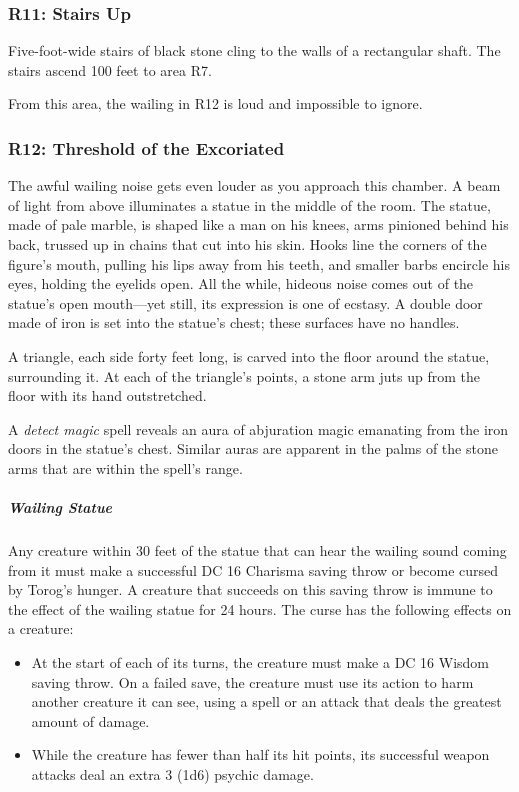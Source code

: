 \documentclass[10pt,a4paper,twoside,bg=print,twocolumn,openany,nodeprecatedcode]{dndbook}
\begin{document}
\subsubsection{R11: Stairs Up}
Five-foot-wide stairs of black stone cling to the walls of a rectangular shaft. The stairs ascend 100 feet to area R7.

From this area, the wailing in R12 is loud and impossible to ignore.

\subsubsection{R12: Threshold of the Excoriated}
\begin{DndReadAloud}{}
The awful wailing noise gets even louder as you approach this chamber. A beam of light from above illuminates a statue in the middle of the room. The statue, made of pale marble, is shaped like a man on his knees, arms pinioned behind his back, trussed up in chains that cut into his skin. Hooks line the corners of the figure's mouth, pulling his lips away from his teeth, and smaller barbs encircle his eyes, holding the eyelids open. All the while, hideous noise comes out of the statue's open mouth—yet still, its expression is one of ecstasy. A double door made of iron is set into the statue's chest; these surfaces have no handles.

A triangle, each side forty feet long, is carved into the floor around the statue, surrounding it. At each of the triangle's points, a stone arm juts up from the floor with its hand outstretched.

\end{DndReadAloud}

A \textit{detect magic} spell reveals an aura of abjuration magic emanating from the iron doors in the statue's chest. Similar auras are apparent in the palms of the stone arms that are within the spell's range.

\subparagraph{Wailing Statue}
Any creature within 30 feet of the statue that can hear the wailing sound coming from it must make a successful DC 16 Charisma saving throw or become cursed by Torog's hunger. A creature that succeeds on this saving throw is immune to the effect of the wailing statue for 24 hours. The curse has the following effects on a creature:


\begin{itemize}
\item At the start of each of its turns, the creature must make a DC 16 Wisdom saving throw. On a failed save, the creature must use its action to harm another creature it can see, using a spell or an attack that deals the greatest amount of damage.
\item While the creature has fewer than half its hit points, its successful weapon attacks deal an extra 3 (1d6) psychic damage.
\end{itemize}
\end{document}
